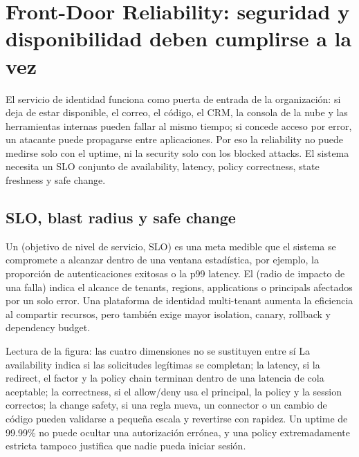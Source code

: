 \section{Front-Door Reliability: seguridad y disponibilidad deben cumplirse a la vez}

El servicio de identidad funciona como puerta de entrada de la organización: si deja de estar disponible, el correo, el código, el CRM, la consola de la nube y las herramientas internas pueden fallar al mismo tiempo; si concede acceso por error, un atacante puede propagarse entre aplicaciones. Por eso la reliability no puede medirse solo con el uptime, ni la security solo con los blocked attacks. El sistema necesita un SLO conjunto de availability, latency, policy correctness, state freshness y safe change.

\subsection{SLO, blast radius y safe change}

Un  (objetivo de nivel de servicio, SLO) es una meta medible que el sistema se compromete a alcanzar dentro de una ventana estadística, por ejemplo, la proporción de autenticaciones exitosas o la p99 latency. El  (radio de impacto de una falla) indica el alcance de tenants, regions, applications o principals afectados por un solo error. Una plataforma de identidad multi-tenant aumenta la eficiencia al compartir recursos, pero también exige mayor isolation, canary, rollback y dependency budget.


\begin{knowledgebox}{Lectura de la figura: las cuatro dimensiones no se sustituyen entre sí}
La availability indica si las solicitudes legítimas se completan; la latency, si la redirect, el factor y la policy chain terminan dentro de una latencia de cola aceptable; la correctness, si el allow/deny usa el principal, la policy y la session correctos; la change safety, si una regla nueva, un connector o un cambio de código pueden validarse a pequeña escala y revertirse con rapidez. Un uptime de 99.99\% no puede ocultar una autorización errónea, y una policy extremadamente estricta tampoco justifica que nadie pueda iniciar sesión.
\end{knowledgebox}

